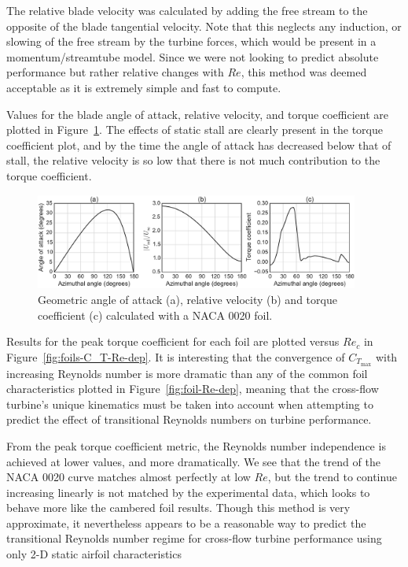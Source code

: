 \documentclass[energies,article,accept,moreauthors,pdftex,12pt,a4paper]{mdpi}
\begin{document}
The relative blade velocity was calculated by adding the free stream to the
opposite of the blade tangential velocity. Note that this neglects any
induction, or slowing of the free stream by the turbine forces, which would be
present in a momentum/streamtube model. Since we were not looking to predict
absolute performance but rather relative changes with $Re$, this method was
deemed acceptable as it is extremely simple and fast to compute. 

Values for the blade angle of attack, relative velocity, and torque coefficient
are plotted in Figure~\ref{fig:blade-kinematics}. The effects of static stall
are clearly present in the torque coefficient plot, and by the time the angle of
attack has decreased below that of stall, the relative velocity is so low that
there is not much contribution to the torque coefficient.

\begin{figure}[ht]
\centering
\includegraphics[width=0.95\textwidth]{figures/foil_kinematics_ct}
\caption{Geometric angle of attack (a), relative velocity (b) and torque coefficient
(c) calculated with a NACA 0020 foil.}
\label{fig:blade-kinematics}
\end{figure}

Results for the peak torque coefficient for each foil are plotted versus $Re_c$
in Figure~\ref{fig:foils-C_T-Re-dep}. It is interesting that the convergence of
$C_{T_\mathrm{max}}$ with increasing Reynolds number is more dramatic than any of the
common foil characteristics plotted in Figure~\ref{fig:foil-Re-dep}, meaning
that the cross-flow turbine's unique kinematics must be taken into account when
attempting to predict the effect of transitional Reynolds numbers on turbine
performance. 

From the peak torque coefficient metric, the Reynolds number independence is
achieved at lower values, and more dramatically. We see that the trend of the
NACA 0020 curve matches almost perfectly at low $Re$, but the trend to continue
increasing linearly is not matched by the experimental data, which looks to
behave more like the cambered foil results. Though this method is very
approximate, it nevertheless appears to be a reasonable way to predict the
transitional Reynolds number regime for cross-flow turbine performance using
only 2-D static airfoil characteristics
\end{document}
